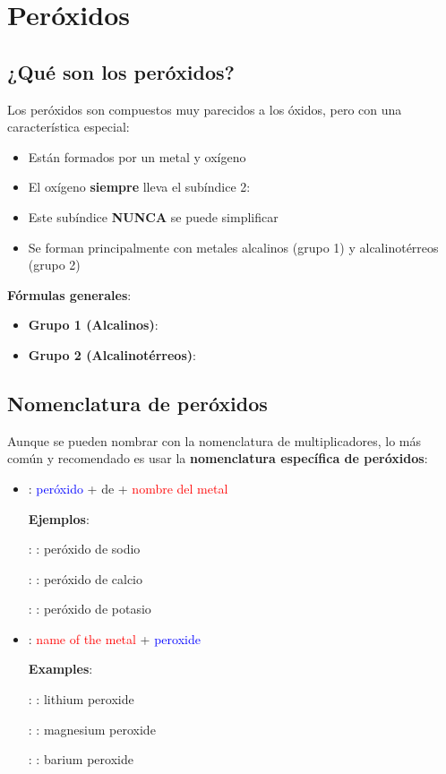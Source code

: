 \vspace{0.3cm}


\section{Peróxidos}

\subsection{¿Qué son los peróxidos?}

Los peróxidos son compuestos muy parecidos a los óxidos, pero con una característica especial:

\begin{itemize}
    \item Están formados por un metal y oxígeno
    \item El oxígeno \textbf{siempre} lleva el subíndice 2: 
    \item Este subíndice \textbf{NUNCA} se puede simplificar
    \item Se forman principalmente con metales alcalinos (grupo 1) y alcalinotérreos (grupo 2)
\end{itemize}

\textbf{Fórmulas generales}:
\begin{itemize}
    \item \textbf{Grupo 1 (Alcalinos)}: 
    \item \textbf{Grupo 2 (Alcalinotérreos)}: 
\end{itemize}

\subsection{Nomenclatura de peróxidos}

Aunque se pueden nombrar con la nomenclatura de multiplicadores, lo más común y recomendado es usar la \textbf{nomenclatura específica de peróxidos}:

\begin{itemize}
    \item \noindent{}: \textcolor{blue}{peróxido} + de + \textcolor{red}{nombre del metal}

    \textbf{Ejemplos}:

    : : peróxido de sodio

    : : peróxido de calcio

    : : peróxido de potasio


    \item \noindent{}: \textcolor{red}{name of the metal} + \textcolor{blue}{peroxide}

    \textbf{Examples}:

    : : lithium peroxide

    : : magnesium peroxide

    : : barium peroxide
\end{itemize}

